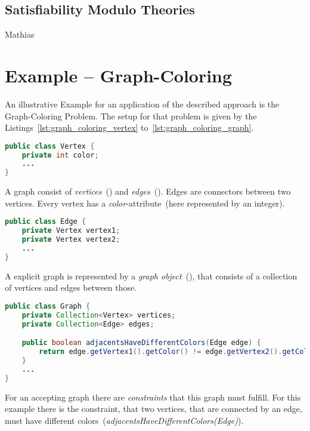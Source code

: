 \documentclass[conference]{IEEEtran}
\begin{document}
\subsection{Satisfiability Modulo Theories}
\label{sec:prelim_smt}

\danger Mathias

\section{Example -- Graph-Coloring}
\label{sec:example}

An illustrative Example for an application of the described approach is the
Graph-Coloring Problem. The setup for that problem is given by the
Listings~\ref{lst:graph_coloring_vertex} to~\ref{lst:graph_coloring_graph}.

\begin{lstlisting}[language=java,label=lst:graph_coloring_vertex,
    caption=Example -- Vertex]
public class Vertex {
	private int color;
	...
}
\end{lstlisting}

A graph consist of \emph{vertices}~() and
\emph{edges}~(). Edges are connectors
between two vertices. Every vertex has a \emph{color}-attribute~(here
represented by an integer).

\begin{lstlisting}[language=java,label=lst:graph_coloring_edge,
    caption=Example -- Edge]
public class Edge {
    private Vertex vertex1;
    private Vertex vertex2;
    ...
}
\end{lstlisting}

A explicit graph is represented by a
\emph{graph object}~(), that consists of a
collection of vertices and edges between those.

\begin{lstlisting}[language=java,label=lst:graph_coloring_graph,
  caption=Example -- Graph]
public class Graph {
    private Collection<Vertex> vertices;
    private Collection<Edge> edges;

    public boolean adjacentsHaveDifferentColors(Edge edge) {
        return edge.getVertex1().getColor() != edge.getVertex2().getColor();
    }
    ...
}
\end{lstlisting}

For an accepting graph there are \emph{constraints} that this graph must
fulfill. For this example there is the constraint, that two vertices, that are
connected by an edge, must have different
colors~(\emph{adjacentsHaveDifferentColors(Edge)}).
\end{document}
